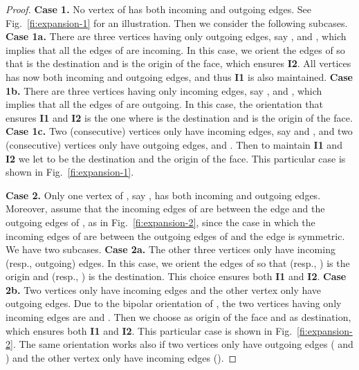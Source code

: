 \documentclass[a4paper]{article}
\begin{document}
\begin{proof}
{\noindent \bf Case 1.} No vertex of  has both incoming and outgoing edges. See Fig.~\ref{fi:expansion-1} for an illustration. Then we consider the following subcases. {\bf Case 1a.} There are three vertices having only outgoing edges, say ,  and , which implies that all the edges of  are incoming. In this case, we orient the edges of  so that  is the destination and  is the origin of the face, which ensures {\bf I2}. All vertices has now both incoming and outgoing edges, and thus {\bf I1} is also maintained. 
{\bf Case 1b.} There are three vertices having only incoming edges, say ,  and , which implies that all the edges of  are outgoing. In this case, the orientation that ensures {\bf I1} and {\bf I2} is the one where  is the destination and  is the origin of the face. 
{\bf Case 1c.} Two (consecutive) vertices only have incoming edges, say  and , and two (consecutive) vertices only have outgoing edges,  and .  Then to maintain {\bf I1} and {\bf I2} we let  to be the destination and  the origin of the face. This particular case is shown in Fig.~\ref{fi:expansion-1}. 

\medskip

{\noindent \bf Case 2.} Only one vertex of  , say , has both incoming and outgoing edges. Moreover, assume that the incoming edges of  are between the edge  and the outgoing edges of , as in Fig.~\ref{fi:expansion-2}, since the case in which the incoming edges of  are between the outgoing edges of  and the edge  is symmetric. We have two subcases. 
{\bf Case 2a.} The other three vertices only have incoming (resp., outgoing) edges. In this case,  we orient the edges of  so that  (resp., ) is the origin and  (resp., ) is the destination. This choice ensures both {\bf I1} and {\bf I2}. 
{\bf Case 2b.} Two vertices only have incoming edges and the other vertex only have outgoing edges. Due to the bipolar orientation of , the two vertices having only incoming edges are  and . Then we choose  as origin of the face and  as destination, which ensures both {\bf I1} and {\bf I2}. This particular case is shown in Fig.~\ref{fi:expansion-2}. The same orientation works also if two vertices only have outgoing edges ( and ) and the other vertex only have incoming edges ().

\medskip


\end{proof}
\end{document}

